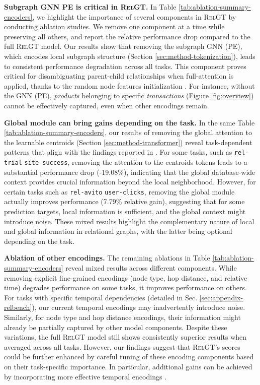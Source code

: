 \documentclass{article} %
\newcommand{\RelGT}{\textsc{RelGT}\xspace}
\begin{document}
\textbf{Subgraph GNN PE is critical in \RelGT.} In Table \ref{tab:ablation-summary-encoders}, we highlight the importance of several components in \RelGT by conducting ablation studies. We remove one component at a time while preserving all others, and report the relative performance drop compared to the full \RelGT model. Our results show that removing the subgraph GNN (PE), which encodes local subgraph structure (Section \ref{sec:method-tokenization}), %
leads to consistent performance degradation across all tasks. This component proves critical for disambiguating parent-child relationships when full-attention is applied, thanks to the random node features initialization \citep{sato2021random, kanatsoulis2025learning}. 
For instance, without the GNN (PE), \textit{products} belonging to specific \textit{transactions} (Figure \ref{fig:overview}) cannot be effectively captured, even when other encodings remain.


\textbf{Global module can bring gains depending on the task.} 
In the same Table \ref{tab:ablation-summary-encoders}, our results of removing the global attention to the learnable centroids (Section \ref{sec:method-transformer}) reveal task-dependent patterns that align with the findings reported in \citep{kong2023goat, dwivedi2023graph}. For some tasks, such as \texttt{rel-trial} \texttt{site-success}, removing the attention to the centroids tokens leads to a substantial performance drop (-19.08\%), indicating that the global database-wide context provides crucial information beyond the local neighborhood. However, for certain tasks such as \texttt{rel-avito} \texttt{user-clicks}, removing the global module actually improves performance (7.79\% relative gain), suggesting that for some prediction targets, local information is sufficient, and the global context might introduce noise. These mixed results highlight the complementary nature of local and global information in relational graphs, with the latter being optional depending on the task. %


\textbf{Ablation of other encodings.} The remaining ablations in Table \ref{tab:ablation-summary-encoders} reveal mixed results across different components. While removing explicit fine-grained encodings (node type, hop distance, and relative time) degrades performance on some tasks, it improves performance on others. For tasks with specific temporal dependencies (detailed in Sec. \ref{sec:appendix-relbench}), our current 
temporal 
encodings may inadvertently introduce noise. Similarly, for node type and hop distance encodings, their information might already be partially captured by other model components. Despite these variations, the full \RelGT model still shows consistently superior results when averaged across all tasks. However, our findings suggest that \RelGT's scores could be further enhanced by careful tuning of these encoding components based on their task-specific importance. 
In particular, additional gains can be achieved by incorporating more effective temporal encodings 
\citep{clauset2012persistence, huang2024utg, jiang2023exploring}.
\end{document}
